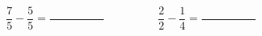 
\question \[ \frac{7}{5} - \frac{5}{5} = \frac{\hspace{2cm}}{\hspace{2cm}}
             \hspace{2cm}
             \frac{2}{2} - \frac{1}{4} = \frac{\hspace{2cm}}{\hspace{2cm}}
          \]

